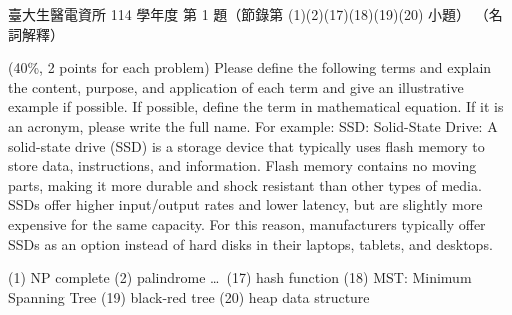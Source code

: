 \begin{pastexam}[label={px:ntu-114-bmei-ca-01}]{臺大生醫電資所 114 學年度 第 1 題（節錄第 (1)(2)(17)(18)(19)(20) 小題）}
（名詞解釋）

(40\%, 2 points for each problem) Please define the following terms and explain the content, purpose, and application of each term and give an illustrative example if possible. If possible, define the term in mathematical equation. If it is an acronym, please write the full name. For example: SSD: Solid-State Drive: A solid-state drive (SSD) is a storage device that typically uses flash memory to store data, instructions, and information. Flash memory contains no moving parts, making it more durable and shock resistant than other types of media. SSDs offer higher input/output rates and lower latency, but are slightly more expensive for the same capacity. For this reason, manufacturers typically offer SSDs as an option instead of hard disks in their laptops, tablets, and desktops.

(1) NP complete (2) palindrome \ldots\ (17) hash function (18) MST: Minimum Spanning Tree (19) black-red tree (20) heap data structure
\end{pastexam}

